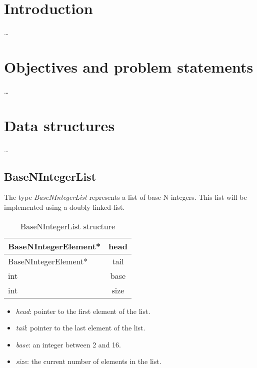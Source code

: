 \documentclass[book, nodocumentinfo]{upmethodology-document}
\begin{document}
\chapter{Introduction}

…

\tableofcontents

\listofalgorithms

\chapter{Objectives and problem statements}

…

\chapter{Data structures}

…

\section{BaseNIntegerList}

The type \emph{BaseNIntegerList} represents a list of base-N integers.
This list will be implemented using a doubly linked-list.

\begin{table}[h]
    \centering
    \label{tab:basenintegerlist-struct}

    \begin{tabular}{|l|c|}
        \hline
        BaseNIntegerElement* & head \\
        \hline
        BaseNIntegerElement* & tail \\
        \hline
        int & base \\
        \hline
        int & size \\
        \hline
    \end{tabular}

    \caption{BaseNIntegerList structure}
\end{table}

\begin{itemize}
    \item \emph{head}: pointer to the first element of the list.
    \item \emph{tail}: pointer to the last element of the list.
    \item \emph{base}: an integer between 2 and 16.
    \item \emph{size}: the current number of elements in the list.
\end{itemize}
\end{document}
